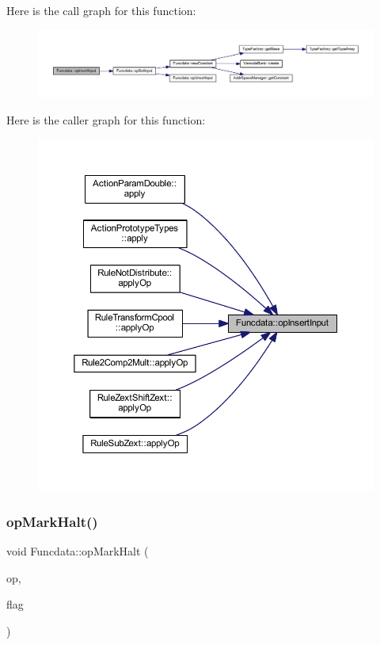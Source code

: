 Here is the call graph for this function\+:
\nopagebreak
\begin{figure}[H]
\begin{center}
\leavevmode
\includegraphics[width=350pt]{class_funcdata_ab34e641f5ee6f2ebf4aa708e21f2b24c_cgraph}
\end{center}
\end{figure}
Here is the caller graph for this function\+:
\nopagebreak
\begin{figure}[H]
\begin{center}
\leavevmode
\includegraphics[width=350pt]{class_funcdata_ab34e641f5ee6f2ebf4aa708e21f2b24c_icgraph}
\end{center}
\end{figure}
\mbox{\label{class_funcdata_acdbfab2362e4d4945c3feb7d3f2c42f2}} 
\subsubsection{\texorpdfstring{opMarkHalt()}{opMarkHalt()}}
{\footnotesize\ttfamily void Funcdata\+::op\+Mark\+Halt (\begin{DoxyParamCaption}\item[{\mbox{\hyperlink{class_pcode_op}{Pcode\+Op}} $\ast$}]{op,  }\item[{uint4}]{flag }\end{DoxyParamCaption})}



